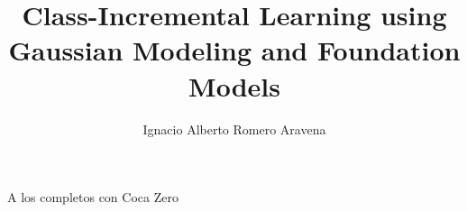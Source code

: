 \documentclass[english]{umemoria}
\author{Ignacio Alberto Romero Aravena}
\title{Class-Incremental Learning using Gaussian Modeling and Foundation Models}
\begin{document}
\frontmatter
\maketitle



\begin{dedicatoria}
A los completos con Coca Zero
\end{dedicatoria}

\begin{thanks}

\end{thanks}


\renewcommand{\contentsname}{Table of Content}
\tableofcontents
\listoftables %
\listoffigures %


\mainmatter







\nocite{*}



\end{document}

